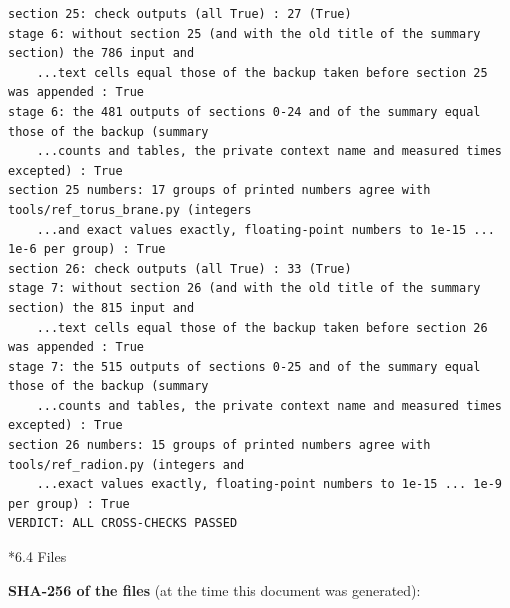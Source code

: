 \documentclass[10pt,a4paper]{article}
\makeatletter
\renewcommand\subsection{\@startsection{subsection}{2}{\z@}{-3.25ex\@plus -1ex \@minus -.2ex}{1.5ex \@plus .2ex}{\normalfont\large\bfseries\raggedright}}
\makeatother
\begin{document}
\begin{Verbatim}[fontsize=\small,frame=single,framesep=2mm]
section 25: check outputs (all True) : 27 (True)
stage 6: without section 25 (and with the old title of the summary section) the 786 input and
    ...text cells equal those of the backup taken before section 25 was appended : True
stage 6: the 481 outputs of sections 0-24 and of the summary equal those of the backup (summary
    ...counts and tables, the private context name and measured times excepted) : True
section 25 numbers: 17 groups of printed numbers agree with tools/ref_torus_brane.py (integers
    ...and exact values exactly, floating-point numbers to 1e-15 ... 1e-6 per group) : True
section 26: check outputs (all True) : 33 (True)
stage 7: without section 26 (and with the old title of the summary section) the 815 input and
    ...text cells equal those of the backup taken before section 26 was appended : True
stage 7: the 515 outputs of sections 0-25 and of the summary equal those of the backup (summary
    ...counts and tables, the private context name and measured times excepted) : True
section 26 numbers: 15 groups of printed numbers agree with tools/ref_radion.py (integers and
    ...exact values exactly, floating-point numbers to 1e-15 ... 1e-9 per group) : True
VERDICT: ALL CROSS-CHECKS PASSED
\end{Verbatim}
\subsection*{6.4 Files}
\textbf{SHA-256 of the files} (at the time this document was generated):
\end{document}
